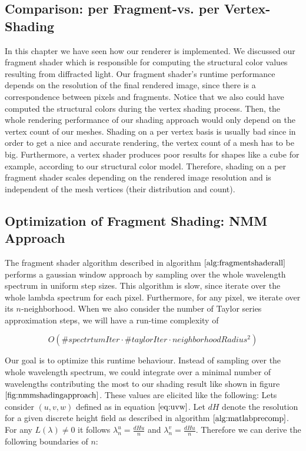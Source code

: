 \subsection{Comparison: per Fragment-vs. per Vertex-Shading}
In this chapter we have seen how our renderer is implemented. We discussed our fragment shader which is responsible for computing the structural color values resulting from diffracted light. Our fragment shader's runtime performance depends on the resolution of the final rendered image, since there is a correspondence between pixels and fragments. Notice that we also could have computed the structural colors during the vertex shading process. Then, the whole rendering performance of our shading approach would only depend on the vertex count of our meshes. Shading on a per vertex basis is usually bad since in order to get a nice and accurate rendering, the vertex count of a mesh has to be big. Furthermore, a vertex shader produces poor results for shapes like a cube for example, according to our structural color model. Therefore, shading on a per fragment shader scales depending on the rendered image resolution and is independent of the mesh vertices (their distribution and count).

\subsection{Optimization of Fragment Shading: NMM Approach}
\label{sec:nmmapproach}
The fragment shader algorithm described in algorithm $\ref{alg:fragmentshaderall}$ performs a gaussian window approach by sampling over the whole wavelength spectrum in uniform step sizes. This algorithm is slow, since iterate over the whole lambda spectrum for each pixel. Furthermore, for any pixel, we iterate over its $n$-neighborhood. When we also consider the number of Taylor series approximation steps, we will have a run-time complexity of

\begin{equation}
O(\#spectrtumIter \cdot \#taylorIter \cdot neighborhoodRadius^2)
\end{equation}
 
Our goal is to optimize this runtime behaviour. Instead of sampling over the whole wavelength spectrum, we could integrate over a minimal number of  wavelengths contributing the most to our shading result like shown in figure $\ref{fig:nmmshadingapproach}$. These values are elicited like the following: Lets consider $(u,v,w)$ defined as in equation $\ref{eq:uvw}$. Let $dH$ denote the resolution for a given discrete height field as described in algorithm $\ref{alg:matlabprecomp}$. For any $L(\lambda) \neq 0$ it follows $\lambda_{n}^{u} = \frac{dH u}{n}$ and $\lambda_{n}^{v} = \frac{dH u}{n}$. Therefore we can derive the following boundaries of $n$:

